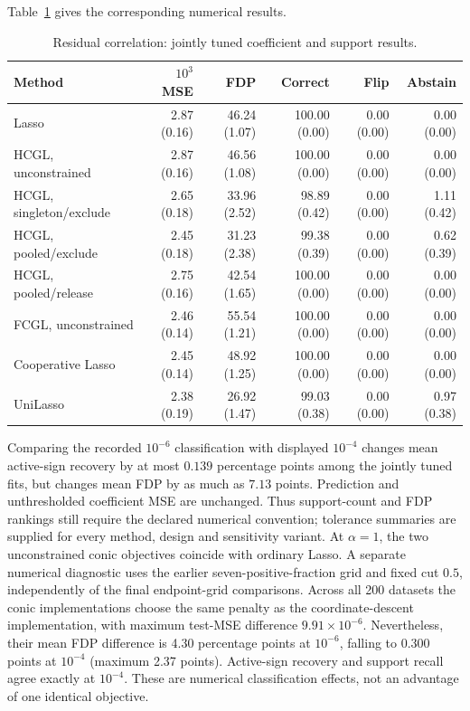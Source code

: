 \documentclass[11pt,a4paper]{article}
\begin{document}
\noindent Table~\ref{tab:learned-metrics-residual-correlation} gives the corresponding numerical results.

\begin{table}[htbp]
\centering\small\setlength{\tabcolsep}{3pt}
\caption{Residual correlation: jointly tuned coefficient and support results.}
\label{tab:learned-metrics-residual-correlation}
\begin{tabular}{lrrrrr}\toprule
Method & $10^3$ MSE & FDP & Correct & Flip & Abstain\\\midrule
Lasso & 2.87 (0.16) & 46.24 (1.07) & 100.00 (0.00) & 0.00 (0.00) & 0.00 (0.00) \\
HCGL, unconstrained & 2.87 (0.16) & 46.56 (1.08) & 100.00 (0.00) & 0.00 (0.00) & 0.00 (0.00) \\
HCGL, singleton/exclude & 2.65 (0.18) & 33.96 (2.52) & 98.89 (0.42) & 0.00 (0.00) & 1.11 (0.42) \\
HCGL, pooled/exclude & 2.45 (0.18) & 31.23 (2.38) & 99.38 (0.39) & 0.00 (0.00) & 0.62 (0.39) \\
HCGL, pooled/release & 2.75 (0.16) & 42.54 (1.65) & 100.00 (0.00) & 0.00 (0.00) & 0.00 (0.00) \\
FCGL, unconstrained & 2.46 (0.14) & 55.54 (1.21) & 100.00 (0.00) & 0.00 (0.00) & 0.00 (0.00) \\
Cooperative Lasso & 2.45 (0.14) & 48.92 (1.25) & 100.00 (0.00) & 0.00 (0.00) & 0.00 (0.00) \\
UniLasso & 2.38 (0.19) & 26.92 (1.47) & 99.03 (0.38) & 0.00 (0.00) & 0.97 (0.38) \\
\bottomrule\end{tabular}
\end{table}

Comparing the recorded $10^{-6}$ classification with displayed $10^{-4}$ changes mean
active-sign recovery by at most $0.139$ percentage points among the jointly tuned
fits, but changes mean FDP by as much as $7.13$ points. Prediction and unthresholded
coefficient MSE are unchanged. Thus support-count and FDP rankings still require
the declared numerical convention; tolerance summaries are supplied for every
method, design and sensitivity variant.
At $\alpha=1$, the two unconstrained conic objectives coincide with ordinary
Lasso. A separate numerical diagnostic uses the earlier seven-positive-fraction
grid and fixed cut $0.5$, independently of the final endpoint-grid comparisons.
Across all 200 datasets the conic implementations choose the same penalty as
the coordinate-descent implementation, with maximum test-MSE difference
$9.91\times10^{-6}$. Nevertheless, their mean FDP difference is 4.30 percentage
points at $10^{-6}$, falling to 0.300 points at $10^{-4}$ (maximum 2.37 points).
Active-sign recovery and support recall agree exactly at $10^{-4}$. These are
numerical classification effects, not an advantage of one identical objective.
\end{document}

